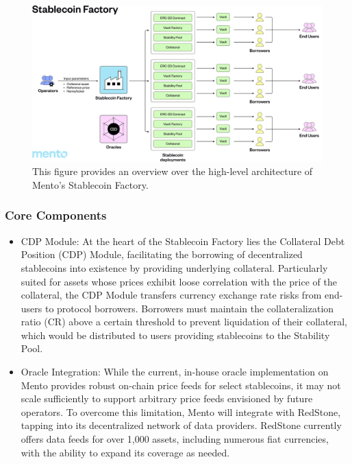 \documentclass[a4paper]{article}
\theoremstyle{definition}
\begin{document}
\begin{figure}[ht]
    \centering
    \includegraphics[width=1\linewidth]{figures/stablecoin_factory.png}
    \caption{This figure provides an overview over the high-level architecture of Mento's Stablecoin Factory.}
    \label{fig:stablecoin_factory}
\end{figure}

\subsubsection{Core Components}
\begin{itemize}
    \item CDP Module: At the heart of the Stablecoin Factory lies the Collateral Debt Position (CDP) Module, facilitating the borrowing of decentralized stablecoins into existence by providing underlying collateral. Particularly suited for assets whose prices exhibit loose correlation with the price of the collateral, the CDP Module transfers currency exchange rate risks from end-users to protocol borrowers. Borrowers must maintain the collateralization ratio (CR) above a certain threshold to prevent liquidation of their collateral, which would be distributed to users providing stablecoins to the Stability Pool.
    \item Oracle Integration: While the current, in-house oracle implementation on Mento provides robust on-chain price feeds for select stablecoins, it may not scale sufficiently to support arbitrary price feeds envisioned by future operators. To overcome this limitation, Mento will integrate with RedStone, tapping into its decentralized network of data providers. RedStone currently offers data feeds for over 1,000 assets, including numerous fiat currencies, with the ability to expand its coverage as needed.
\end{itemize}
\end{document}
